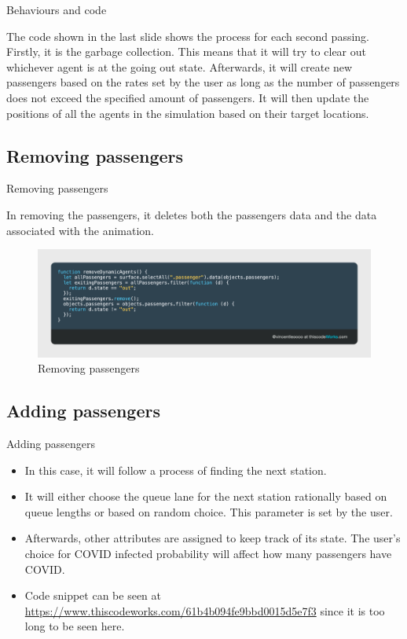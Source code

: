 \documentclass{beamer}
\begin{document}
\begin{frame}{Behaviours and code}
	
	The code shown in the last slide shows the process for each second passing. Firstly, it is the garbage collection. This means that it will try to clear out whichever agent is at the going out state. Afterwards, it will create new passengers based on the rates set by the user as long as the number of passengers does not exceed the specified amount of passengers. It will then update the positions of all the agents in the simulation based on their target locations.
\end{frame}

\subsection{Removing passengers}

\begin{frame}{Removing passengers}
	
	In removing the passengers, it deletes both the passengers data and the data associated with the animation.
	
	\begin{figure}
		\includegraphics[width=\linewidth]{../img/remove-passengers}\caption{Removing passengers}
	\end{figure}
\end{frame}

\subsection{Adding passengers}

\begin{frame}{Adding passengers}
	
	\begin{itemize}
		\item In this case, it will follow a process of finding the next station.
		\item It will either choose the queue lane for the next station rationally based on queue lengths or based on random choice. This parameter is set by the user. 
		\item Afterwards, other attributes are assigned to keep track of its state. The user's choice for COVID infected probability will affect how many passengers have COVID.
		\item Code snippet can be seen at \url{https://www.thiscodeworks.com/61b4b094fe9bbd0015d5e7f3} since it is too long to be seen here.
	\end{itemize}
	
	
\end{frame}
\end{document}

